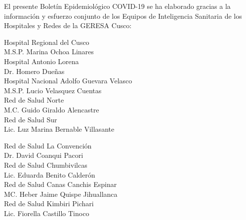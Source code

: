 \documentclass[12pt,a4paper,openany]{book}
\begin{document}
	\centering
		{\large El presente Boletín Epidemiológico COVID-19 se ha elaborado gracias a la información y esfuerzo conjunto de los Equipos de Inteligencia Sanitaria de los Hospitales y Redes de la GERESA Cusco:

		\vspace{0.5cm}
		\noindent
		\begin{minipage}[t]{.45\textwidth}
			\centering
			Hospital Regional del Cusco \\
			M.S.P. Marina Ochoa Linares \vspace{0.5cm}\\
			Hospital Antonio Lorena \\
			Dr. Homero Dueñas \vspace{.5cm}\\
			Hospital Nacional Adolfo Guevara Velasco\\
			M.S.P. Lucio Velasquez Cuentas \vspace{.5cm}\\
			Red de Salud Norte \\
			M.C. Guido Giraldo Alencastre\vspace{0.5cm}\\
			Red de Salud Sur\\
			Lic. Luz Marina Bernable Villasante \vspace{0.5cm}\\	
		\end{minipage}
		\hfill
		\noindent
		\begin{minipage}[t]{.45\textwidth}
			\centering
			Red de Salud La Convención\\
			Dr. David Coanqui Pacori\vspace{0.5cm}\\
			Red de Salud Chumbivilcas\\
			Lic. Eduarda Benito Calderón \vspace{.5cm}\\
			Red de Salud Canas Canchis Espinar\\
			MC. Heber Jaime Quispe Jihuallanca \vspace{.5cm}\\
			Red de Salud Kimbiri Pichari \\
			Lic. Fiorella Castillo Tinoco\vspace{0.5cm}\\	
		\end{minipage}
}
\end{document}
